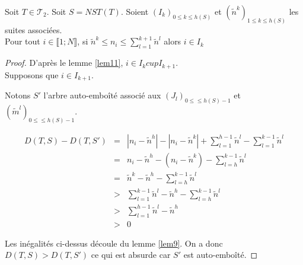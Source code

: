 \begin{lem}
  \label{lem12}
  Soit $T \in \mathcal{T}_{2}$. Soit $S = NST(T)$.  Soient
  $(I_{k})_{0 \leqslant k \leqslant h(S)}$ et
  $(\tilde{n}^{k})_{1 \leqslant k \leqslant h(S)}$ les suites
  associées.\\
  Pour tout $i \in \llbracket 1;N \rrbracket$, si $\tilde{n}^{k}
  \leqslant n_{i} \leqslant \sum_{l=1}^{k+1}\tilde{n}^{l}$ alors $i \in I_{k}$
  \begin{proof}
    D'après le lemme \ref{lem11}, $i \in I_{k} cup I_{k+1}$.\\
    Supposons que $i \in I_{k+1}$.
    
    Notons $S'$ l'arbre auto-emboîté associé aux
    $(J_{l})_{0 \leqslant \leqslant h(S)-1}$ et
    $(\tilde{m}^{l})_{0 \leqslant \leqslant h(S)-1}$.
    \begin{center}
      $$
      \begin{array}{rcl}
        D(T,S) - D(T,S') &=& |n_{i}-\tilde{n}^{h}| -
                             |n_{i}-\tilde{n}^{k}| + \sum_{l=1}^{h-1}
                             \tilde{n}^{l} -\sum_{l=1}^{k-1} \tilde{n}^{l}\\
                         &=& n_{i} - \tilde{n}^{h} -
                             (n_{i}-\tilde{n}^{k}) - \sum_{l=h}^{k-1}
                             \tilde{n}^{l} \\
                         &=& \tilde{n}^{k} - \tilde{n}^{h} -
                             \sum_{l=h}^{k-1} \tilde{n}^{l} \\
                         &>& \sum_{l=1}^{k-1} \tilde{n}^{l} -
                             \tilde{n}^{h} - \sum_{l=h}^{k-1} \tilde{n}^{l} \\
                         &>& \sum_{l=1}^{h-1} \tilde{n}^{l} -
                             \tilde{n}^{h}\\
                         &>&0
      \end{array}
      $$
    \end{center}
    Les inégalités ci-dessus découle du lemme \ref{lem9}. 
    On a donc $D(T,S) > D(T,S')$ ce qui est absurde car $S'$ est auto-emboîté.
  \end{proof}
\end{lem}


\noindent\hrulefill
